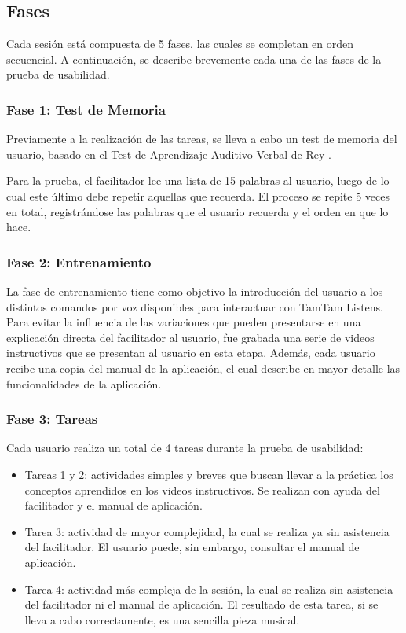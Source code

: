 \subsection{Fases}
Cada sesi\'on est\'a compuesta de 5 fases, las cuales se completan en orden secuencial.
A continuaci\'on, se describe brevemente cada una de las fases de la prueba de usabilidad.

\subsubsection{Fase 1: Test de Memoria}
Previamente a la realizaci\'on de las tareas, se lleva a cabo un test de memoria del usuario, basado en
el Test de Aprendizaje Auditivo Verbal de Rey \cite{Lopez1998}. 

Para la prueba, el facilitador lee una lista
de 15 palabras al usuario, luego de lo cual este \'ultimo debe repetir aquellas que recuerda.
El proceso se repite 5 veces en total, registr\'andose las palabras que el usuario recuerda y el orden 
en que lo hace.

\subsubsection{Fase 2: Entrenamiento}
La fase de entrenamiento tiene como objetivo la introducci\'on del usuario a los distintos comandos por voz disponibles
para interactuar con TamTam Listens. 
Para evitar la influencia de las variaciones que pueden presentarse en una
explicaci\'on directa del facilitador al usuario, fue grabada una serie de videos instructivos 
que se presentan al usuario en esta etapa.
Adem\'as, cada usuario recibe una copia del manual de la aplicaci\'on, el cual describe en mayor detalle las
funcionalidades de la aplicaci\'on.

\subsubsection{Fase 3: Tareas}
Cada usuario realiza un total de 4 tareas durante la prueba de usabilidad:
	\begin{itemize}			
		\item Tareas 1 y 2: actividades simples y breves que buscan llevar a la pr\'actica los conceptos 
		aprendidos en los videos instructivos. Se realizan con ayuda del facilitador y el manual de aplicaci\'on.
		\item Tarea 3: actividad de mayor complejidad, la cual se realiza ya sin asistencia del facilitador.
		El usuario puede, sin embargo, consultar el manual de aplicaci\'on.
		\item Tarea 4: actividad m\'as compleja de la sesi\'on, la cual se realiza sin asistencia del facilitador
		ni el manual de aplicaci\'on. El resultado de esta tarea, si se lleva a cabo correctamente, es una sencilla pieza musical.
	\end{itemize}

